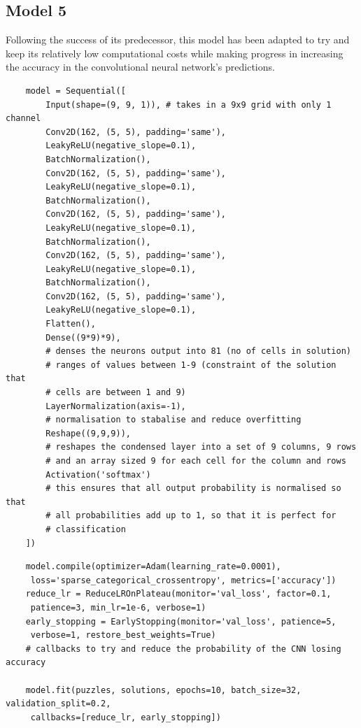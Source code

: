 \documentclass[]{final_report}
\begin{document}
\subsection{Model 5}

Following the success of its predecessor, this model has been adapted to try and keep its relatively low computational costs while making progress in increasing the accuracy in the convolutional neural network's predictions.

\begin{verbatim}
    model = Sequential([
        Input(shape=(9, 9, 1)), # takes in a 9x9 grid with only 1 channel
        Conv2D(162, (5, 5), padding='same'),
        LeakyReLU(negative_slope=0.1),
        BatchNormalization(),
        Conv2D(162, (5, 5), padding='same'),
        LeakyReLU(negative_slope=0.1),
        BatchNormalization(),
        Conv2D(162, (5, 5), padding='same'),
        LeakyReLU(negative_slope=0.1),
        BatchNormalization(),
        Conv2D(162, (5, 5), padding='same'),
        LeakyReLU(negative_slope=0.1),
        BatchNormalization(),
        Conv2D(162, (5, 5), padding='same'),
        LeakyReLU(negative_slope=0.1),
        Flatten(),
        Dense((9*9)*9),
        # denses the neurons output into 81 (no of cells in solution) 
        # ranges of values between 1-9 (constraint of the solution that 
        # cells are between 1 and 9)
        LayerNormalization(axis=-1),
        # normalisation to stabalise and reduce overfitting
        Reshape((9,9,9)),
        # reshapes the condensed layer into a set of 9 columns, 9 rows 
        # and an array sized 9 for each cell for the column and rows
        Activation('softmax')
        # this ensures that all output probability is normalised so that 
        # all probabilities add up to 1, so that it is perfect for 
        # classification
    ])
\end{verbatim}

\begin{verbatim}
    model.compile(optimizer=Adam(learning_rate=0.0001), 
     loss='sparse_categorical_crossentropy', metrics=['accuracy'])
    reduce_lr = ReduceLROnPlateau(monitor='val_loss', factor=0.1, 
     patience=3, min_lr=1e-6, verbose=1)
    early_stopping = EarlyStopping(monitor='val_loss', patience=5, 
     verbose=1, restore_best_weights=True)
    # callbacks to try and reduce the probability of the CNN losing accuracy

    model.fit(puzzles, solutions, epochs=10, batch_size=32, validation_split=0.2,
     callbacks=[reduce_lr, early_stopping])
\end{verbatim}
\end{document}
